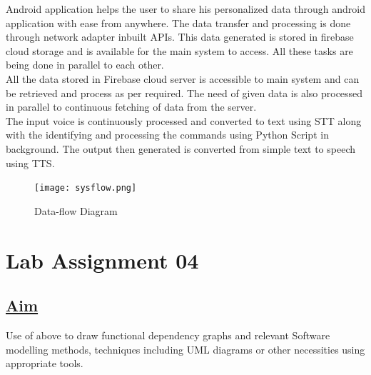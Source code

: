 \noindent
Android application helps the user to share his personalized data through android application with ease from anywhere. The data transfer and processing is done through network adapter inbuilt APIs. This data generated is stored in firebase cloud storage and is available for the main system to access. All these tasks are being done in parallel to each other.\\

\noindent
All the data stored in Firebase cloud server is accessible to main system and can be retrieved and process as per required. The need of given data is also processed in parallel to continuous fetching of data from the server.\\

\noindent
The input voice is continuously processed and converted to text using STT along with the identifying and processing the commands using Python Script in background. The output then generated is converted from simple text to speech using TTS.\\
     
    \begin{figure}[H]
    \texttt{[image: sysflow.png]}\\
    \caption{Data-flow Diagram}
    \end{figure}

\newpage
\section*{\centering\LARGE{Lab Assignment 04}}
\subsection*{\underline{Aim}}
Use of above to draw functional dependency graphs and relevant Software modelling methods, techniques including UML diagrams or other necessities using appropriate tools.
